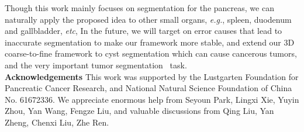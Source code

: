 \documentclass[10pt,twocolumn,letterpaper]{article}
\begin{document}
Though this work mainly focuses on segmentation for the pancreas, we can naturally apply the proposed idea to other small organs, \emph{e.g.}, spleen, duodenum and gallbladder, \emph{etc},  In the future, we will target on error causes that lead to inaccurate segmentation to make our framework more stable, and extend our 3D coarse-to-fine framework to cyst segmentation which can cause cancerous tumors, and the very important tumor segmentation~\cite{zhu2018multi} task.\\
{\bf Acknowledgements} This work was supported by the Lustgarten Foundation for Pancreatic Cancer Research, and National Natural Science Foundation of China No. 61672336. We appreciate enormous help from Seyoun Park, Lingxi Xie, Yuyin Zhou, Yan Wang, Fengze Liu, and valuable discussions from Qing Liu, Yan Zheng, Chenxi Liu, Zhe Ren.

\newpage
{\small


}
\end{document}
